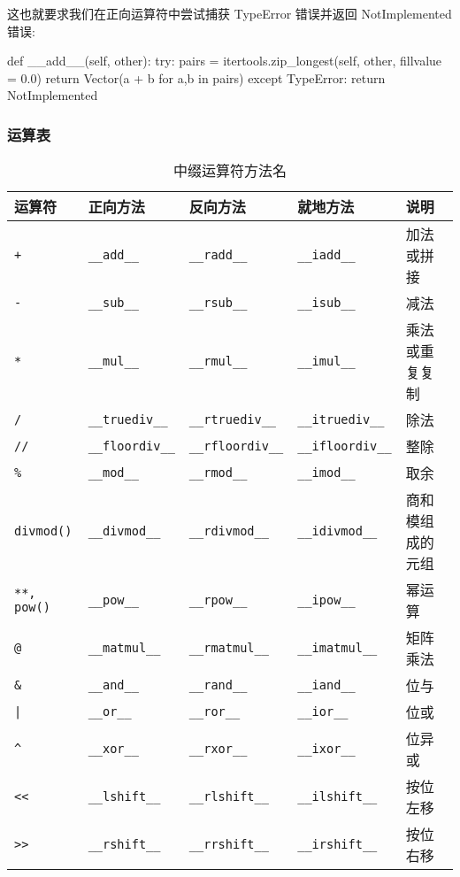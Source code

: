 这也就要求我们在正向运算符中尝试捕获 TypeError 错误并返回 NotImplemented 错误:

\begin{python}
def __add__(self, other):
    try:
        pairs = itertools.zip_longest(self, other, fillvalue = 0.0)
        return Vector(a + b for a,b in pairs)
    except TypeError:
        return NotImplemented
\end{python}

\subsubsection{运算表}

\begin{table}[H]
    \centering
    \caption{中缀运算符方法名}
    \label{table:中缀运算符方法名}
    \setlength{\tabcolsep}{2mm}
    \begin{tabular}{l|llll}
        \toprule
        \textbf{运算符} & \textbf{正向方法} & \textbf{反向方法} & \textbf{就地方法} & \textbf{说明} \\
        \midrule
        \texttt{+}  & \texttt{\_\_add\_\_} & \texttt{\_\_radd\_\_} & \texttt{\_\_iadd\_\_} & 加法或拼接 \\
        \texttt{-}  & \texttt{\_\_sub\_\_} & \texttt{\_\_rsub\_\_} & \texttt{\_\_isub\_\_} & 减法\\
        \texttt{*}  & \texttt{\_\_mul\_\_} & \texttt{\_\_rmul\_\_} & \texttt{\_\_imul\_\_} & 乘法或重复复制\\
        \texttt{/}  & \texttt{\_\_truediv\_\_} & \texttt{\_\_rtruediv\_\_} & \texttt{\_\_itruediv\_\_} & 除法\\
        \texttt{//} & \texttt{\_\_floordiv\_\_} & \texttt{\_\_rfloordiv\_\_} & \texttt{\_\_ifloordiv\_\_} & 整除\\
        \texttt{\%} & \texttt{\_\_mod\_\_} & \texttt{\_\_rmod\_\_} & \texttt{\_\_imod\_\_} & 取余\\
        \texttt{divmod()} & \texttt{\_\_divmod\_\_} & \texttt{\_\_rdivmod\_\_} & \texttt{\_\_idivmod\_\_} & 商和模组成的元组\\
        \texttt{**, pow()} & \texttt{\_\_pow\_\_} & \texttt{\_\_rpow\_\_} & \texttt{\_\_ipow\_\_} & 幂运算\\
        \texttt{@} & \texttt{\_\_matmul\_\_} & \texttt{\_\_rmatmul\_\_} & \texttt{\_\_imatmul\_\_} & 矩阵乘法\\
        \texttt{\&} & \texttt{\_\_and\_\_} & \texttt{\_\_rand\_\_} & \texttt{\_\_iand\_\_} & 位与\\
        \texttt{|} & \texttt{\_\_or\_\_} & \texttt{\_\_ror\_\_} & \texttt{\_\_ior\_\_} & 位或\\
        \texttt{\^} & \texttt{\_\_xor\_\_} & \texttt{\_\_rxor\_\_} & \texttt{\_\_ixor\_\_} & 位异或\\
        \texttt{<<} & \texttt{\_\_lshift\_\_} & \texttt{\_\_rlshift\_\_} & \texttt{\_\_ilshift\_\_} & 按位左移\\
        \texttt{>>} & \texttt{\_\_rshift\_\_} & \texttt{\_\_rrshift\_\_} & \texttt{\_\_irshift\_\_} & 按位右移\\
        \bottomrule
    \end{tabular}
\end{table}

\newpage